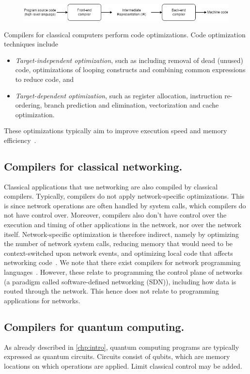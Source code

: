 \begin{figure}
    \centering
    \includegraphics[width=\columnwidth]{figures/compiler/frontend-backend.png}
    \caption{}
    \label{compiler:fig:frontend-backend}
\end{figure}

Compilers for classical computers perform code optimizations.
Code optimization techniques include
\begin{itemize}
  \item \emph{Target-independent optimization}, such as including removal of dead (unused) code, optimizations of looping constructs and combining common expressions to reduce code, and
  \item \emph{Target-dependent optimization}, such as register allocation, instruction re-ordering, branch prediction and elimination, vectorization and cache optimization.
\end{itemize}
These optimizations typically aim to improve execution speed and memory efficiency~\cite{aho_compilers_2006}.

\subsection{Compilers for classical networking.}
Classical applications that use networking are also compiled by classical compilers.
Typically, compilers do not apply network-specific optimizations.
This is since network operations are often handled by system calls, which compilers do not have control over.
Moreover, compilers also don't have control over the execution and timing of other applications in the network, nor over the network itself.
Network-specific optimization is therefore indirect, namely by optimizing the number of network system calls, reducing memory that would need to be context-switched upon network events, and optimizing local code that affects networking code~\cite{danalis_mpi-aware_2009}.
We note that there exist compilers for network programming languages~\cite{monsanto_compiler_2012, li_modular_2020}.
However, these relate to programming the control plane of networks (a paradigm called software-defined networking (SDN)), including how data is routed through the network.
This hence does not relate to programming applications for networks.


\subsection{Compilers for quantum computing.}
\label{compiler:sec:compilers-qc}
As already described in \cref{chp:intro}, quantum computing programs are typically expressed as quantum circuits.
Circuits consist of qubits, which are memory locations on which operations are applied.
Limit classical control may be added.

